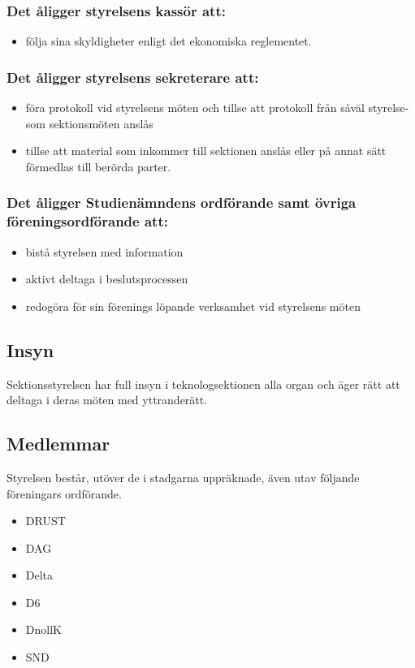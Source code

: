 \documentclass[a4paper, 10pt]{article}
\begin{document}
\subsubsection{Det åligger styrelsens kassör att:}
\begin{itemize}
  \item följa sina skyldigheter enligt det ekonomiska reglementet. 
\end{itemize}
\subsubsection{Det åligger styrelsens sekreterare att:}
\begin{itemize}
  \item föra protokoll vid styrelsens möten och tillse att protokoll från såväl styrelse- som sektionsmöten anslås
  \item tillse att material som inkommer till sektionen anslås eller på annat sätt förmedlas till berörda parter.
\end{itemize}
\subsubsection{Det åligger Studienämndens ordförande samt övriga föreningsordförande att:}
\begin{itemize}
  \item bistå styrelsen med information 
  \item aktivt deltaga i beslutsprocessen 
  \item redogöra för sin förenings löpande verksamhet vid styrelsens möten 
\end{itemize}
\subsection{Insyn} 
Sektionsstyrelsen har full insyn i teknologsektionen alla organ och äger rätt att deltaga i deras möten med yttranderätt. 
\subsection{Medlemmar} 
Styrelsen består, utöver de i stadgarna uppräknade, även utav följande föreningars ordförande. 
\begin{itemize}
  \item DRUST 
  \item DAG 
  \item Delta 
  \item D6 
  \item DnollK 
  \item SND 
\end{itemize}
\end{document}
